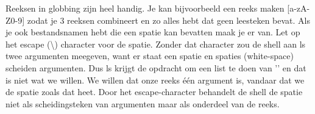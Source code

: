 Reeksen in globbing zijn heel handig. Je kan bijvoorbeeld een reeks maken [a-zA-Z0-9] zodat je 3 reeksen combineert en zo alles hebt dat geen leesteken bevat. Als je ook bestandsnamen hebt die een spatie kan bevatten maak je er  van. Let op het escape (\textbackslash) character voor de spatie. Zonder dat character zou de shell aan ls twee argumenten meegeven, want er staat een spatie en spaties (white-space) scheiden argumenten. Dus ls krijgt de opdracht om een list te doen van '' en dat is niet wat we willen. We willen dat onze reeks \'{e}\'{e}n argument is, vandaar dat we de spatie  zoals dat heet. Door het escape-character behandelt de shell de spatie niet als scheidingsteken van argumenten maar als onderdeel van de reeks.
